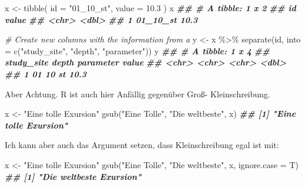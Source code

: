 \documentclass[
]{article}
\newenvironment{Shaded}{\begin{snugshade}}{\end{snugshade}}
\newcommand{\AttributeTok}[1]{\textcolor[rgb]{0.77,0.63,0.00}{#1}}
\newcommand{\CommentTok}[1]{\textcolor[rgb]{0.56,0.35,0.01}{\textit{#1}}}
\newcommand{\DocumentationTok}[1]{\textcolor[rgb]{0.56,0.35,0.01}{\textbf{\textit{#1}}}}
\newcommand{\FloatTok}[1]{\textcolor[rgb]{0.00,0.00,0.81}{#1}}
\newcommand{\FunctionTok}[1]{\textcolor[rgb]{0.00,0.00,0.00}{#1}}
\newcommand{\NormalTok}[1]{#1}
\newcommand{\OtherTok}[1]{\textcolor[rgb]{0.56,0.35,0.01}{#1}}
\newcommand{\SpecialCharTok}[1]{\textcolor[rgb]{0.00,0.00,0.00}{#1}}
\newcommand{\StringTok}[1]{\textcolor[rgb]{0.31,0.60,0.02}{#1}}
\begin{document}
\begin{Shaded}
\begin{Highlighting}[]

\NormalTok{x }\OtherTok{\textless{}{-}} \FunctionTok{tibble}\NormalTok{(}
  \AttributeTok{id =} \StringTok{"01\_10\_st"}\NormalTok{,}
  \AttributeTok{value =} \FloatTok{10.3}
\NormalTok{)}
\NormalTok{x}
\DocumentationTok{\#\# \# A tibble: 1 x 2}
\DocumentationTok{\#\#   id       value}
\DocumentationTok{\#\#   \textless{}chr\textgreater{}    \textless{}dbl\textgreater{}}
\DocumentationTok{\#\# 1 01\_10\_st  10.3}

\CommentTok{\# Create new columns with the information from a}
\NormalTok{y }\OtherTok{\textless{}{-}}\NormalTok{ x }\SpecialCharTok{\%\textgreater{}\%}
  \FunctionTok{separate}\NormalTok{(id, }\AttributeTok{into =} \FunctionTok{c}\NormalTok{(}\StringTok{"study\_site"}\NormalTok{, }\StringTok{"depth"}\NormalTok{, }\StringTok{"parameter"}\NormalTok{))}
\NormalTok{y}
\DocumentationTok{\#\# \# A tibble: 1 x 4}
\DocumentationTok{\#\#   study\_site depth parameter value}
\DocumentationTok{\#\#   \textless{}chr\textgreater{}      \textless{}chr\textgreater{} \textless{}chr\textgreater{}     \textless{}dbl\textgreater{}}
\DocumentationTok{\#\# 1 01         10    st         10.3}
\end{Highlighting}
\end{Shaded}

Aber Achtung. R ist auch hier Anfällig gegenüber Groß- Kleinschreibung.

\begin{Shaded}
\begin{Highlighting}[]
\NormalTok{x }\OtherTok{\textless{}{-}} \StringTok{"Eine tolle Exursion"}
\FunctionTok{gsub}\NormalTok{(}\StringTok{"Eine Tolle"}\NormalTok{, }\StringTok{"Die weltbeste"}\NormalTok{, x)}
\DocumentationTok{\#\# [1] "Eine tolle Exursion"}
\end{Highlighting}
\end{Shaded}

Ich kann aber auch das Argument setzen, dass Kleinschreibung egal ist mit:

\begin{Shaded}
\begin{Highlighting}[]
\NormalTok{x }\OtherTok{\textless{}{-}} \StringTok{"Eine tolle Exursion"}
\FunctionTok{gsub}\NormalTok{(}\StringTok{"Eine Tolle"}\NormalTok{, }\StringTok{"Die weltbeste"}\NormalTok{, x, }\AttributeTok{ignore.case =}\NormalTok{ T)}
\DocumentationTok{\#\# [1] "Die weltbeste Exursion"}
\end{Highlighting}
\end{Shaded}
\end{document}
